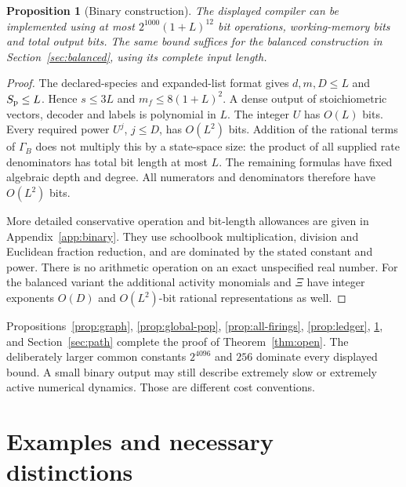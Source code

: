 \documentclass[11pt,reqno]{amsart}
\newtheorem{proposition}[theorem]{Proposition}
\theoremstyle{definition}
\theoremstyle{remark}
\begin{document}
\begin{proposition}[Binary construction]\label{prop:binary}
The displayed compiler can be implemented using at most
$2^{1000}(1+L)^{12}$ bit operations, working-memory bits and total output bits.
The same bound suffices for the balanced construction in
Section~\ref{sec:balanced}, using its complete input length.
\end{proposition}
\begin{proof}
The declared-species and expanded-list format gives $d,m,D\le L$ and
$S_{\rm p}\le L$. Hence $s\le3L$ and $m_f\le8(1+L)^2$.
A dense output of stoichiometric vectors, decoder and labels is polynomial
in $L$. The integer $U$ has $O(L)$ bits. Every required power $U^j$, $j\le D$,
has $O(L^2)$ bits. Addition of the rational terms of $\Gamma_B$ does not
multiply this by a state-space size: the product of all supplied rate
denominators has total bit length at most $L$. The remaining formulas have
fixed algebraic depth and degree. All numerators and denominators therefore
have $O(L^2)$ bits.

More detailed conservative operation and bit-length allowances are given in
Appendix~\ref{app:binary}. They use schoolbook multiplication, division and
Euclidean fraction reduction, and are dominated by the stated constant and
power. There is no arithmetic operation on an exact unspecified real number.
For the balanced variant the additional activity monomials and $\Xi$ have
integer exponents $O(D)$ and $O(L^2)$-bit rational representations as well.
\end{proof}

Propositions~\ref{prop:graph}, \ref{prop:global-pop}, \ref{prop:all-firings},
\ref{prop:ledger}, \ref{prop:binary}, and Section~\ref{sec:path} complete the
proof of Theorem~\ref{thm:open}. The deliberately larger common constants
$2^{4096}$ and $256$ dominate every displayed bound. A small binary output may
still describe extremely slow or extremely active numerical dynamics. Those
are different cost conventions.

\section{Examples and necessary distinctions}\label{sec:examples}
\end{document}
